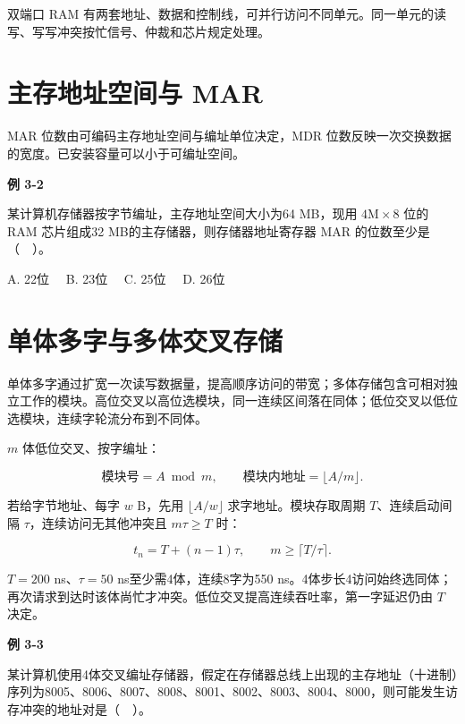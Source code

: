 双端口 RAM 有两套地址、数据和控制线，可并行访问不同单元。同一单元的读写、写写冲突按忙信号、仲裁和芯片规定处理。

\section{主存地址空间与 MAR}\label{CO03-expansion}

MAR 位数由可编码主存地址空间与编址单位决定，MDR 位数反映一次交换数据的宽度。已安装容量可以小于可编址空间。

\par\medskip{}\noindent\hypertarget{CO03-E02}{}\label{CO03-E02}\textbf{例 3-2}\par\nobreak\smallskip

某计算机存储器按字节编址，主存地址空间大小为64 MB，现用 \(4\mathrm M\times8\) 位的 RAM 芯片组成32 MB的主存储器，则存储器地址寄存器 MAR 的位数至少是（　）。

A. 22位　 B. 23位　 C. 25位　 D. 26位

\section{单体多字与多体交叉存储}\label{CO03-interleave}

单体多字通过扩宽一次读写数据量，提高顺序访问的带宽；多体存储包含可相对独立工作的模块。高位交叉以高位选模块，同一连续区间落在同体；低位交叉以低位选模块，连续字轮流分布到不同体。

\(m\) 体低位交叉、按字编址：

\[\text{模块号}=A\bmod m,\qquad\text{模块内地址}=\lfloor A/m\rfloor.\]

若给字节地址、每字 \(w\) B，先用 \(\lfloor A/w\rfloor\) 求字地址。模块存取周期 \(T\)、连续启动间隔 \(\tau\)，连续访问无其他冲突且 \(m\tau\ge T\) 时：

\[t_n=T+(n-1)\tau,\qquad m\ge\lceil T/\tau\rceil.\]

\(T=200\) ns、\(\tau=50\) ns至少需4体，连续8字为550 ns。4体步长4访问始终选同体；再次请求到达时该体尚忙才冲突。低位交叉提高连续吞吐率，第一字延迟仍由 \(T\) 决定。

\par\medskip{}\noindent\hypertarget{CO03-E03}{}\label{CO03-E03}\textbf{例 3-3}\par\nobreak\smallskip

某计算机使用4体交叉编址存储器，假定在存储器总线上出现的主存地址（十进制）序列为8005、8006、8007、8008、8001、8002、8003、8004、8000，则可能发生访存冲突的地址对是（　）。


